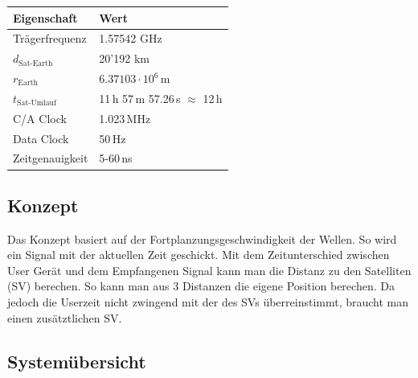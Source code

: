     \begin{minipage}{6cm}
        \begin{tabular}{|l|l|}
            \hline
                \textbf{Eigenschaft} & \textbf{Wert} \\
            \hline
	            Trägerfrequenz
	                & 1.57542 GHz \\
	            $d_{\text{Sat-Earth}}$
	                & 20'192 km \\
	            $r_{\text{Earth}}$
	               & $6.37103\cdot 10^{6}$\,m \\
	            $t_{\text{Sat-Umlauf}}$
	               & 11\,h 57\,m 57.26\,s $\approx$ 12\,h \\	         
	            C/A Clock
	               & 1.023\,MHz \\
	            Data Clock
	               & 50\,Hz \\
				Zeitgenauigkeit
				   & 5-60\,ns \\
	               
            \hline
        \end{tabular}
    \end{minipage}    

\subsection{Konzept}
	Das Konzept basiert auf der Fortplanzungsgeschwindigkeit der Wellen. So wird
	ein Signal mit der aktuellen Zeit geschickt. Mit dem Zeitunterschied
	zwischen User Gerät und dem Empfangenen Signal kann man die Distanz zu den
	Satelliten (SV) berechen. So kann man aus 3 Distanzen die eigene Position
	berechen. Da jedoch die Userzeit nicht zwingend mit der des SVs
	überreinstimmt,  braucht man einen zusätztlichen SV.
\subsection{Systemübersicht} 


